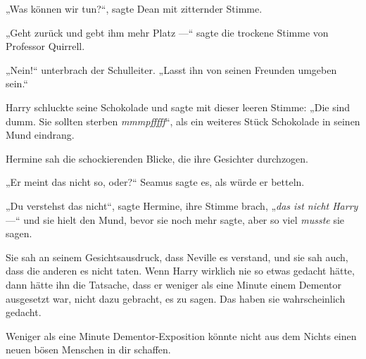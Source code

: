„Was können wir tun?“, sagte Dean mit zitternder Stimme.

„Geht zurück und gebt ihm mehr Platz —“ sagte die trockene Stimme von Professor Quirrell.

„Nein!“ unterbrach der Schulleiter.
„Lasst ihn von seinen Freunden umgeben sein.“

Harry schluckte seine Schokolade und sagte mit dieser leeren Stimme:
„Die sind dumm. Sie sollten sterben \emph{mmmpfffff}“, als ein weiteres Stück Schokolade in seinen Mund eindrang.

Hermine sah die schockierenden Blicke, die ihre Gesichter durchzogen.

„Er meint das nicht so, oder?“ Seamus sagte es, als würde er betteln.

„Du verstehst das nicht“, sagte Hermine, ihre Stimme brach, „\emph{das ist nicht Harry} —“ und sie hielt den Mund, bevor sie noch mehr sagte, aber so viel \emph{musste} sie sagen.

Sie sah an seinem Gesichtsausdruck, dass Neville es verstand, und sie sah auch, dass die anderen es nicht taten. Wenn Harry wirklich nie so etwas gedacht hätte, dann hätte ihn die Tatsache, dass er weniger als eine Minute einem Dementor ausgesetzt war, nicht dazu gebracht, es zu sagen. Das haben sie wahrscheinlich gedacht.

Weniger als eine Minute Dementor-Exposition könnte nicht aus dem Nichts einen neuen bösen Menschen in dir schaffen.

